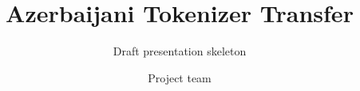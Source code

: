 \documentclass[aspectratio=169]{beamer}
\title{Azerbaijani Tokenizer Transfer}
\subtitle{Draft presentation skeleton}
\author{Project team}
\date{}
\begin{document}
\begin{frame}
  \titlepage
\end{frame}





\end{document}

